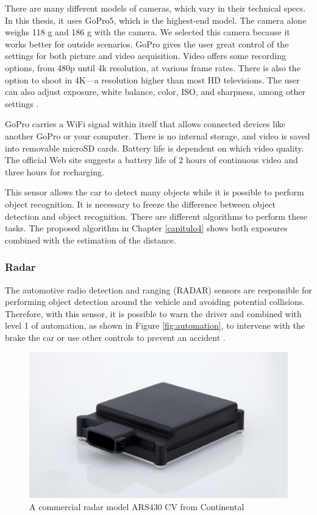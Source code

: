 There are many different models of cameras, which vary in their technical specs. In this thesis, it uses GoPro5, which is the highest-end model. The camera alone weighs 118 g and 186 g with the camera. We selected this camera because it works better for outside scenarios. GoPro gives the user great control of the settings for both picture and video acquisition. Video offers some recording options, from 480p until 4k resolution, at various frame rates. There is also the option to shoot in 4K—a resolution higher than most HD televisions. The user can also adjust exposure, white balance, color, ISO, and sharpness, among other settings \cite{paro2015video}.

GoPro carries a WiFi signal within itself that allows connected devices like another GoPro or your computer. There is no internal storage, and video is saved into removable microSD cards. Battery life is dependent on which video quality. The official Web site suggests a battery life of 2 hours of continuous video and three hours for recharging.

This sensor allows the car to detect many objects while it is possible to perform object recognition. It is necessary to freeze the difference between object detection and object recognition. There are different algorithms to perform these tasks. The proposed algorithm in Chapter \ref{capitulo4} shows both exposures combined with the estimation of the distance. 

\subsubsection{Radar}\label{sub:radar}

The automotive radio detection and ranging (RADAR) sensors are responsible for performing object detection around the vehicle and avoiding potential collisions. Therefore, with this sensor, it is possible to warn the driver and combined with level 1 of automation, as shown in Figure \ref{fig:automation}, to intervene with the brake the car or use other controls to prevent an accident \cite{ariyur2006collision}.

\begin{figure}[H]
\centering
\includegraphics[width=120mm]{imagens/radar.jpg}
\caption{A commercial radar model ARS430 CV from Continental}
\label{fig:camera}
\end{figure}

